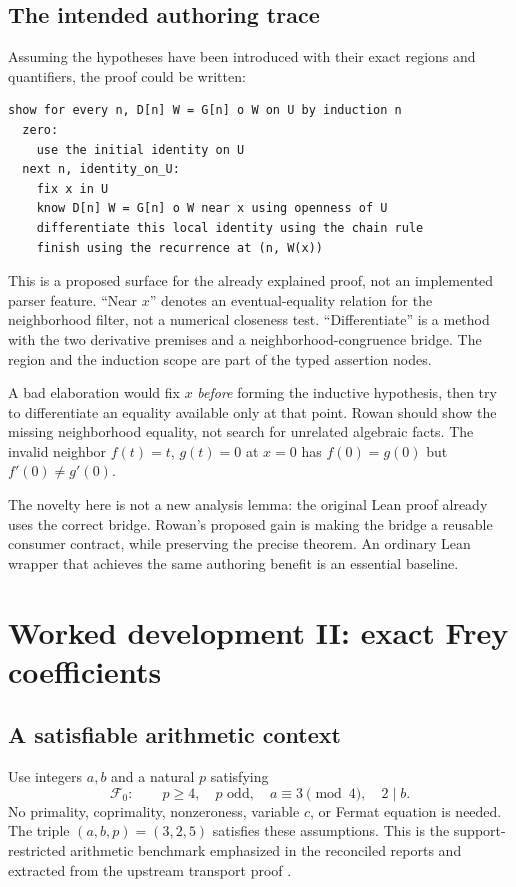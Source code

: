 \documentclass[11pt,letterpaper]{article}
\theoremstyle{definition}\newtheorem{definition}[theorem]{Definition}
\theoremstyle{remark}\newtheorem{remark}[theorem]{Remark}
\begin{document}
\subsection{The intended authoring trace}
Assuming the hypotheses have been introduced with their exact regions and
quantifiers, the proof could be written:
\begin{lstlisting}
show for every n, D[n] W = G[n] o W on U by induction n
  zero:
    use the initial identity on U
  next n, identity_on_U:
    fix x in U
    know D[n] W = G[n] o W near x using openness of U
    differentiate this local identity using the chain rule
    finish using the recurrence at (n, W(x))
\end{lstlisting}
This is a proposed surface for the already explained proof, not an implemented
parser feature. ``Near $x$'' denotes an eventual-equality relation for the
neighborhood filter, not a numerical closeness test. ``Differentiate'' is a
method with the two derivative premises and a neighborhood-congruence bridge.
The region and the induction scope are part of the typed assertion nodes.

A bad elaboration would fix $x$ \emph{before} forming the inductive hypothesis,
then try to differentiate an equality available only at that point. Rowan
should show the missing neighborhood equality, not search for unrelated
algebraic facts. The invalid neighbor $f(t)=t$, $g(t)=0$ at $x=0$ has
$f(0)=g(0)$ but $f'(0)\ne g'(0)$.

The novelty here is not a new analysis lemma: the original Lean proof already
uses the correct bridge. Rowan's proposed gain is making the bridge a reusable
consumer contract, while preserving the precise theorem. An ordinary Lean
wrapper that achieves the same authoring benefit is an essential baseline.

\section{Worked development II: exact Frey coefficients}
\label{sec:frey}

\subsection{A satisfiable arithmetic context}
Use integers $a,b$ and a natural $p$ satisfying
\begin{equation}\label{eq:F0}
 \mathcal F_0:\qquad p\ge4,\quad p\text{ odd},\quad
 a\equiv3\pmod4,\quad 2\mid b.
\end{equation}
No primality, coprimality, nonzeroness, variable $c$, or Fermat equation is
needed. The triple $(a,b,p)=(3,2,5)$ satisfies these assumptions. This is the
support-restricted arithmetic benchmark emphasized in the reconciled reports
\cite{round3a,round3b} and extracted from the upstream transport proof
\cite{freymap}.
\end{document}
